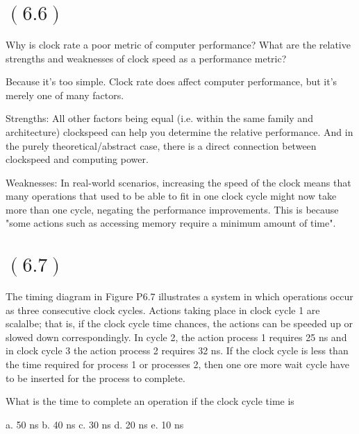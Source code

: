 \documentclass[letterpaper,12pt,titlepage]{article}
\begin{document}
\section*{$(6.6)$} Why is clock rate a poor metric of computer performance? What are the relative strengths and weaknesses of clock speed as a performance metric?

\begin{mdframed}[style=MyFrame]
Because it's too simple. Clock rate does affect computer performance, but it's merely one of many factors.

Strengths: All other factors being equal (i.e. within the same family and architecture) clockspeed can help you determine the relative performance. And in the purely theoretical/abstract case, there is a direct connection between clockspeed and computing power.

Weaknesses: In real-world scenarios, increasing the speed of the clock means that many operations that used to be able to fit in one clock cycle might now take more than one cycle, negating the performance improvements. This is because "some actions such as accessing memory require a minimum amount of time".
\cite{Clements}

\end{mdframed}

\section*{$(6.7)$} The timing diagram in Figure P6.7 illustrates a system in which operations occur as three consecutive clock cycles. Actions taking place in clock cycle 1 are scalalbe; that is, if the clock cycle time chances, the actions can be speeded up or slowed down correspondingly. In cycle 2, the action process 1 requires 25 ns and in clock cycle 3 the action process 2 requires 32 ns. If the clock cycle is less than the time required for process 1 or processes 2, then one ore more wait cycle have to be inserted for the process to complete.

What is the time to complete an operation if the clock cycle time is

a. 50 ns
b. 40 ns
c. 30 ns
d. 20 ns
e. 10 ns

\begin{mdframed}[style=MyFrame]
\end{mdframed}
\end{document}
